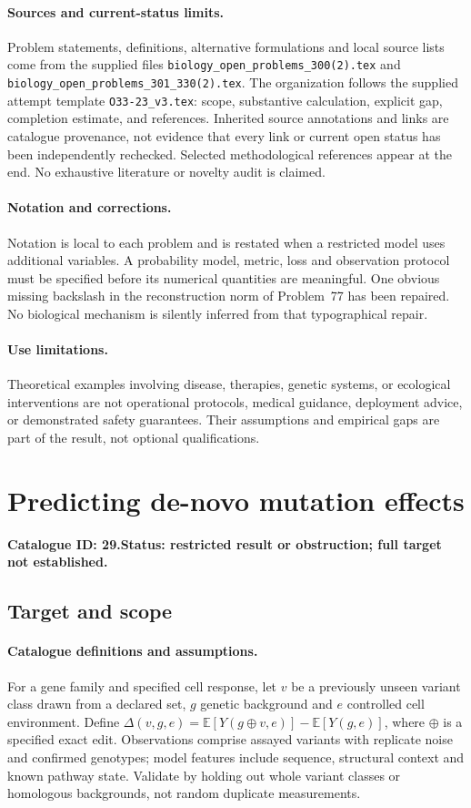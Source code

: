 \documentclass[11pt]{article}
\newcommand{\E}{\mathbb E}
\providecommand{\E}{\mathbb E}
\begin{document}
\paragraph{Sources and current-status limits.}
Problem statements, definitions, alternative formulations and local source lists
come from the supplied files
\texttt{biology\_open\_problems\_300(2).tex} and
\texttt{biology\_open\_problems\_301\_330(2).tex}.
The organization follows the supplied attempt template
\texttt{O33-23\_v3.tex}: scope, substantive calculation, explicit gap,
completion estimate, and references. Inherited source annotations and links are
catalogue provenance, not evidence that every link or current open status has
been independently rechecked. Selected methodological references appear at the
end. No exhaustive literature or novelty audit is claimed.

\paragraph{Notation and corrections.}
Notation is local to each problem and is restated when a restricted model uses
additional variables. A probability model, metric, loss and observation protocol
must be specified before its numerical quantities are meaningful. One obvious
missing backslash in the reconstruction norm of Problem~77 has been repaired.
No biological mechanism is silently inferred from that typographical repair.

\paragraph{Use limitations.}
Theoretical examples involving disease, therapies, genetic systems, or ecological
interventions are not operational protocols, medical guidance, deployment advice,
or demonstrated safety guarantees. Their assumptions and empirical gaps are part
of the result, not optional qualifications.

\setcounter{section}{28}
\section{Predicting de-novo mutation effects}
\label{prob:029}
\noindent\textbf{Catalogue ID: 29.}\quad \textbf{Status: restricted result or obstruction; full target not established.}
\subsection{Target and scope}
\paragraph{Catalogue definitions and assumptions.}
For a gene family and specified cell response, let $v$ be a previously unseen variant class drawn from a declared set, $g$ genetic background and $e$ controlled cell environment. Define $\Delta(v,g,e)=\E[Y(g\oplus v,e)]-\E[Y(g,e)]$, where $\oplus$ is a specified exact edit. Observations comprise assayed variants with replicate noise and confirmed genotypes; model features include sequence, structural context and known pathway state. Validate by holding out whole variant classes or homologous backgrounds, not random duplicate measurements.
\end{document}
